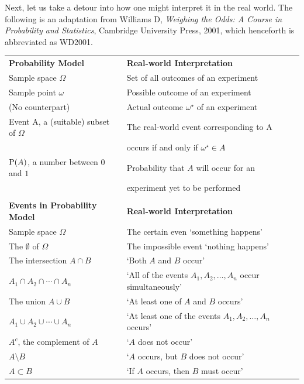 Next, let us take a detour into how one might interpret it in the real world.  The following is an adaptation from Williams D, {\it Weighing the Odds: A Course in Probability and Statistics}, Cambridge University Press, 2001, which henceforth is abbreviated as WD2001.
\begin{center}
\begin{tabular}{l l}
{\bf Probability Model} & {\bf Real-world Interpretation} \\
Sample space $\Omega$ & Set of all outcomes of an experiment \\
Sample point $\omega$ & Possible outcome of an experiment \\ 
(No counterpart) & Actual outcome $\omega^{\star}$ of an experiment\\
Event A, a (suitable) subset of $\Omega$ & The real-world event corresponding to A \\
 & occurs if and only if $\omega^{\star} \in A$\\
$\P(A)$, a number between $0$ and $1$         & Probability that $A$ will occur for an \\
 & experiment yet to be performed \\
\\
{\bf Events in Probability Model} & {\bf Real-world Interpretation} \\
Sample space $\Omega$ & The certain even `something happens' \\
The $\emptyset$ of $\Omega$ & The impossible event `nothing happens' \\ 
The intersection $A \cap B$ & `Both $A$ and $B$ occur'\\
$A_1 \cap A_2 \cap \cdots \cap A_n $ & `All of the events $A_1, A_2, \ldots, A_n$ occur simultaneously'\\
The union $A \cup B$ & `At least one of $A$ and $B$ occurs'\\
$A_1 \cup A_2 \cup \cdots \cup A_n$ & `At least one of the events $A_1, A_2, \ldots, A_n$ occurs'\\
$A^c$, the complement of $A$ & `$A$ does not occur'\\
$A \setminus B$ & `$A$ occurs, but $B$ does not occur'\\
$A \subset B$ & `If $A$ occurs, then $B$ must occur'
\end{tabular}
\end{center}


